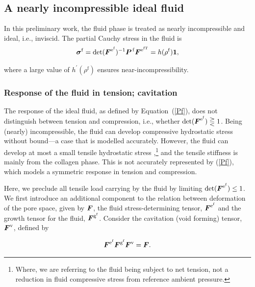 \subsection{A nearly incompressible ideal fluid}
\label{compfluid}

In this preliminary work, the fluid phase is treated as nearly
incompressible and ideal, i.e., inviscid. The partial Cauchy
stress in the fluid is
\begin{equation}
\mbox{\boldmath$\sigma$}^\mathrm{f} =
\mathrm{det}(\mbox{\boldmath$ F$}^{\mathrm{e}^\mathrm{f}})^{-1}
\mbox{\boldmath$ P$}^{\,\mathrm{f}}\mbox{\boldmath$ F$}^{\mathrm{e}^\mathrm{fT}} 
= h(\rho^\mathrm{f}){\bf 1},\label{Pf}
\end{equation}

\noindent where a large value of $h^\prime(\rho^\mathrm{f})$ ensures
near-in\-comp\-ress\-i\-bil\-i\-ty. 
 
\subsubsection{Response of the fluid in tension;
cavitation}\label{tensionfluid}

The response of the ideal fluid, as defined by \mbox{Equation
  (\ref{Pf})}, does not distinguish between tension and compression,
  i.e., whether 
$\mathrm{det}(\mbox{\boldmath$ F$}^{\mathrm{e}^\mathrm{f}}) \gtreqless 1$. Being
(nearly) incompressible, the fluid can develop compressive hydrostatic
  stress
without bound---a case that is modelled accurately. However, the fluid
can develop at most a small tensile hydrostatic stress
\citep{cavitationchris},\footnote{Where, we are referring to the fluid
  being subject to net tension, not a reduction in fluid compressive
  stress from reference ambient pressure.} and the tensile
stiffness is mainly from the collagen phase. This is not accurately
represented by (\ref{Pf}), which models a symmetric response in
tension and compression.

Here, we preclude all tensile load carrying by the fluid by limiting
$\mathrm{det}(\mbox{\boldmath$ F$}^{\mathrm{e}^\mathrm{f}}) \leq 1$. We first introduce
an additional component to the relation between 
deformation of the pore space, given by $\mbox{\boldmath$ F$}$, the fluid
stress-determining tensor, 
$\mbox{\boldmath$ F$}^{\mathrm{e}^\mathrm{f}}$ and the growth tensor for the fluid,
$\mbox{\boldmath$ F$}^{\mathrm{g}^\mathrm{f}}$. Consider the cavitation (void forming) tensor,
$\mbox{\boldmath$ F$}^{\mathrm{v}}$, defined by
  
\begin{equation}
 \mbox{\boldmath$ F$}^{\mathrm{e}^\mathrm{f}}\mbox{\boldmath$ F$}^{\mathrm{g}^\mathrm{f}}
 \mbox{\boldmath$ F$}^{\mathrm{v}} = \mbox{\boldmath$ F$}.
\label{fvoid}
\end{equation}


